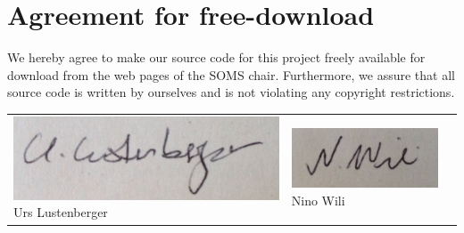 \documentclass[11pt]{article}
\begin{document}

\newpage


\newpage
\section*{Agreement for free-download}
\bigskip


\bigskip


\large We hereby agree to make our source code for this project freely available for download from the web pages of the SOMS chair. Furthermore, we assure that all source code is written by ourselves and is not violating any copyright restrictions.

\begin{center}

\bigskip


\bigskip


\begin{tabular}{@{}p{4cm}@{}p{4cm}@{}@{}p{4cm}@{}}

\begin{minipage}{4cm}
\includegraphics[scale=0.12]{urs.png}
\large \newline Urs Lustenberger
\end{minipage}

&

\begin{minipage}{4cm}

\includegraphics[scale=0.152]{nino.png}
 \large \newline\hspace{4mm} Nino Wili


\end{minipage}
\end{tabular}
\end{center}
\end{document}
